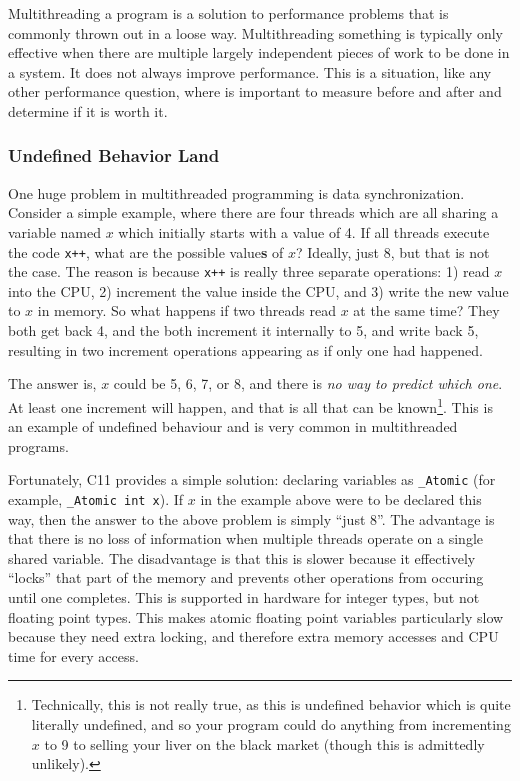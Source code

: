 Multithreading a program is a solution to performance problems that is commonly thrown out in a loose way. Multithreading something is
typically only effective when there are multiple largely independent pieces of work to be done in a system. It does not always improve
performance. This is a situation, like any other performance question, where is important to measure before and after and determine
if it is worth it.

\subsubsection{Undefined Behavior Land}

One huge problem in multithreaded programming is data synchronization. Consider a simple example, where there are four threads which
are all sharing a variable named $x$ which initially starts with a value of 4. If all threads execute the code \texttt{x++}, what are
the possible value\textbf{s} of $x$? Ideally, just 8, but that is not the case. The reason is because \texttt{x++} is really three
separate operations: 1) read $x$ into the CPU, 2) increment the value inside the CPU, and 3) write the new value to $x$ in memory.
So what happens if two threads read $x$ at the same time? They both get back 4, and the both increment it internally to 5, and write
back 5, resulting in two increment operations appearing as if only one had happened.

The answer is, $x$ could be 5, 6, 7, or 8, and there is \textit{no way to predict which one}. At least one increment will happen, and
that is all that can be known\footnote{Technically, this is not really true, as this is undefined behavior which is quite literally undefined, and
so your program could do anything from incrementing $x$ to 9 to selling your liver on the black market (though this is admittedly unlikely).}. This is an example of undefined
behaviour and is very common in multithreaded programs.

Fortunately, C11 provides a simple solution: declaring variables as \texttt{\_Atomic} (for example, \texttt{\_Atomic int x}). If $x$ in
the example above were to be declared this way, then the answer to the above problem is simply ``just 8''. The advantage is that there
is no loss of information when multiple threads operate on a single shared variable. The disadvantage is that this is slower because
it effectively ``locks'' that part of the memory and prevents other operations from occuring until one completes. This is supported
in hardware for integer types, but not floating point types. This makes atomic floating point variables particularly slow because they
need extra locking, and therefore extra memory accesses and CPU time for every access.

